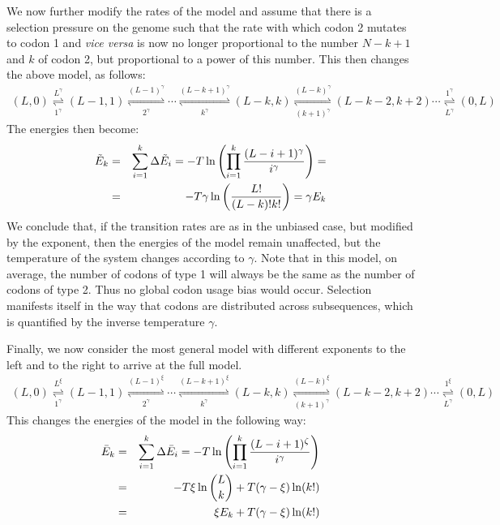 \documentclass[a4paper,10pt]{paper}%
\begin{document}
We now  further modify the rates of the model and  assume that there is a selection pressure on the genome such that the rate with which codon 2 mutates to codon 1  and {\em vice versa} is now no longer proportional to the number $N-k+1$ and $k$ of codon 2, but proportional to a power of this  number. This then changes the above   model, as follows:
%
% 
\begin{eqnarray}
(L,0) \overset{L^\gamma}{\underset{1^\gamma}{\rightleftharpoons}} (L-1,1) \overset{(L-1)^\gamma}{\underset{2^\gamma}{\rightleftharpoons}} \cdots 
  \overset{(L-k+1)^\gamma}{\underset{k^\gamma}{\rightleftharpoons}} (L-k,k) \overset{(L-k)^\gamma}{\underset{(k+1)^\gamma}{\rightleftharpoons}}  (L-k-2,k+2)\cdots  \overset{1^\gamma}{\underset{L^\gamma}{\rightleftharpoons}}  (0,L)
\end{eqnarray}
%
%
The energies then become:
%
%
\begin{eqnarray}
\tilde E_k &=& \sum_{i=1}^k \Delta \tilde E_i= -T\ln\left( \prod_{i=1}^k {(L-i+1)^\gamma \over i^\gamma}  \right)=\nonumber\\
&=& - T\gamma\ln\left(  L!\over (L-k)! k!\right) = \gamma E_k
\end{eqnarray}
%
%   
We conclude that, if  the transition rates are as in the unbiased case, but modified by the exponent, then the energies of the model remain unaffected, but the temperature of the system changes according to $\gamma$. Note that in this model, on average, the number of codons of type 1 will always be the same as the number of codons of type 2. Thus no global codon usage bias would occur. Selection manifests itself in the way that codons are distributed across subsequences, which is quantified by the inverse temperature $\gamma$.  
\par
Finally, we now  consider the most general model with different exponents to the left and to the right to arrive at the full model.
%
% 
\begin{eqnarray}
(L,0) \overset{L^\xi}{\underset{1^\gamma}{\rightleftharpoons}} (L-1,1) \overset{(L-1)^\xi}{\underset{2^\gamma}{\rightleftharpoons}} \cdots  \overset{(L-k+1)^\xi}{\underset{k^\gamma}{\rightleftharpoons}} (L-k,k) \overset{(L-k)^\xi}{\underset{(k+1)^\gamma}{\rightleftharpoons}}  (L-k-2,k+2)\cdots  \overset{1^\xi}{\underset{L^\gamma}{\rightleftharpoons}}  (0,L)
\end{eqnarray}
%
%
This changes the energies of the model in the following way:
%
\begin{eqnarray}
\label{thmodel}
\bar E_k &=& \sum_{i=1}^k \Delta\bar  E_i= -T\ln\left( \prod_{i=1}^k {(L-i+1)^\zeta \over i^\gamma}  \right) \nonumber \\
&=& -T\xi\ln \binom{L}{k} + T(\gamma - \xi)\ln(k!) \nonumber \\
&=& \xi E_k + T(\gamma -\xi)\ln(k!) 
\end{eqnarray}
\end{document}
